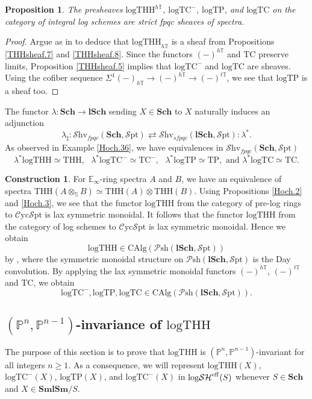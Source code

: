 \documentclass[11pt, a4paper]{amsart}
\newtheorem{prop}[thm]{Proposition}
\theoremstyle{definition}
\newtheorem{const}[thm]{Construction}
\numberwithin{equation}{subsection}
\renewcommand{\P}{\mathbb{P}}
\newcommand{\E}{\mathbb{E}}
\newcommand{\Sch}{\mathbf{Sch}}
\newcommand{\lSch}{\mathbf{lSch}}
\newcommand{\SmlSm}{\mathbf{SmlSm}}
\newcommand{\THH}{\mathrm{THH}}
\newcommand{\TC}{\mathrm{TC}}
\newcommand{\TP}{\mathrm{TP}}
\newcommand{\Sphere}{\mathbb{S}}
\newcommand{\sharpp}{\sharp}
\newcommand{\logTHH}{\mathrm{logTHH}}
\newcommand{\logTC}{\mathrm{logTC}}
\newcommand{\logTP}{\mathrm{logTP}}
\newcommand{\eff}{{\rm eff}}
\newcommand{\infPsh}{\mathcal{P}\mathrm{sh}}
\newcommand{\infShv}{\mathcal{S}\mathrm{hv}}
\newcommand{\infSpt}{\mathcal{S}\mathrm{pt}}
\newcommand{\infCycSpt}{\mathcal{C}\mathrm{yc}\mathcal{S}\mathrm{pt}}
\newcommand{\CAlg}{\mathrm{CAlg}}
\newcommand{\inflogSH}{\mathrm{log}\mathcal{SH}}
\begin{document}
\begin{prop}
\label{THHsheaf.9}
The presheaves $\logTHH^{h\mathbb{T}}$, $\logTC^-$, $\logTP$, and $\logTC$ on the category of integral log schemes are strict fpqc sheaves of spectra.
\end{prop}
\begin{proof}
Argue as in \cite[Corollary 3.4]{BMS19} to deduce that $\logTHH_{h\mathbb{T}}$ is a sheaf from Propositions \ref{THHsheaf.7} and \ref{THHsheaf.8}.
Since the functors $(-)^{h\mathbb{T}}$ and $\TC$ preserve limits,
Proposition \ref{THHsheaf.5} implies that $\logTC^-$ and $\logTC$ are sheaves.
Using the cofiber sequence $\Sigma^1 (-)_{h\mathbb{T}}\to (-)^{h\mathbb{T}}\to (-)^{t\mathbb{T}}$,
we see that $\logTP$ is a sheaf too.
\end{proof}


The functor $\lambda\colon \Sch \to \lSch$ sending $X\in \Sch$ to $X$ naturally induces an adjunction
\begin{equation}
\label{Hoch.21.3}
\lambda_\sharpp : \infShv_{fpqc}(\Sch,\infSpt) \rightleftarrows \infShv_{sfpqc}(\lSch,\infSpt) : \lambda^*.
\end{equation}
As observed in Example \ref{Hoch.36}, we have equivalences in $\infShv_{fpqc}(\Sch,\infSpt)$
\begin{equation}
\label{Hoch.21.4}
\lambda^* \logTHH \simeq \THH,
\text{ }
\lambda^* \logTC^- \simeq \TC^-,
\text{ }
\lambda^* \logTP \simeq \TP,
\text{ and }
\lambda^* \logTC \simeq \TC.
\end{equation}


\begin{const}
\label{Hoch.23}
For $\E_\infty$-ring spectra $A$ and $B$,
we have an equivalence of spectra $\THH(A\otimes_{\Sphere} B)\simeq \THH(A)\otimes \THH(B)$.
Using Propositions \ref{Hoch.2} and \ref{Hoch.3},
we see that the functor $\logTHH$ from the category of pre-log rings to $\infCycSpt$ is lax symmetric monoidal.
It follows that the functor $\logTHH$ from the category of log schemes to $\infCycSpt$ is lax symmetric monoidal.
Hence we obtain
\[
\logTHH\in \CAlg(\infPsh(\lSch,\infSpt))
\]
by \cite[Example 2.2.6.9]{HA},
where the symmetric monoidal structure on $\infPsh(\lSch,\infSpt)$ is the Day convolution.
By applying the lax symmetric monoidal functors $(-)^{h\mathbb{T}}$, $(-)^{t\mathbb{T}}$ and $\TC$,
we obtain
\[
\logTC^-,\logTP,\logTC\in \CAlg(\infPsh(\lSch,\infSpt)).
\]
\end{const}


\subsection{\texorpdfstring{$(\P^n,\P^{n-1})$}{(Pn,Pn-1)}-invariance of \texorpdfstring{$\logTHH$}{logTHH}}
The purpose of this section is to prove that $\logTHH$ is $(\P^n,\P^{n-1})$-invariant for all integers $n\geq 1$.
As a consequence, 
we will represent $\logTHH(X)$, $\logTC^-(X)$, $\logTP(X)$, 
and $\logTC^-(X)$ in $\inflogSH^\eff(S)$ whenever $S\in \Sch$ and $X\in \SmlSm/S$.
\end{document}
